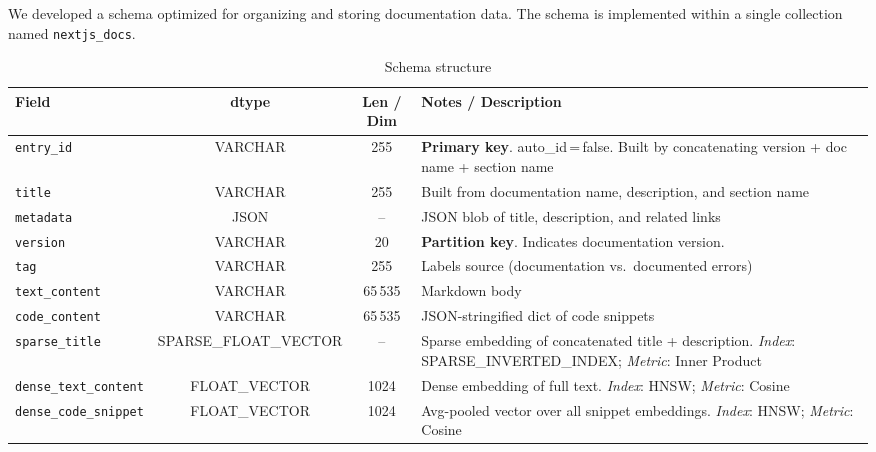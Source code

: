 
We developed a schema optimized for organizing and storing documentation data. The schema is implemented within a single collection named \texttt{nextjs\_docs}.

\begin{table}[H]
	\small
	\centering
	\setlength\tabcolsep{5pt}
	\renewcommand{\arraystretch}{1.2}
	\begin{tabular}{l c c p{6.8cm}}
		\hline
		\textbf{Field} & \textbf{dtype} & \textbf{Len / Dim} & \textbf{Notes  /  Description} \\ \hline
		\texttt{entry\_id}           & VARCHAR                & 255  & \textbf{Primary key}. auto\_id\,=\,false.  Built by concatenating version + doc name + section name \\
		\texttt{title}               & VARCHAR                & 255  & Built from documentation name, description, and section name \\
		\texttt{metadata}            & JSON                   & –    & JSON blob of title, description, and related links \\
		\texttt{version}             & VARCHAR                & 20   & \textbf{Partition key}.  Indicates documentation version.\\
		\texttt{tag}                 & VARCHAR                & 255  & Labels source (documentation vs.\ documented errors) \\
		\hline
		\texttt{text\_content}       & VARCHAR                & 65\,535 & Markdown body \\
		\texttt{code\_content}       & VARCHAR                & 65\,535 & JSON-stringified dict of code snippets \\
		\hline
		\texttt{sparse\_title}       & SPARSE\_FLOAT\_VECTOR  & –    & Sparse embedding of concatenated title + description.  \emph{Index}: SPARSE\_INVERTED\_INDEX; \emph{Metric}: Inner Product \\
		\texttt{dense\_text\_content}& FLOAT\_VECTOR          & 1024 & Dense embedding of full text.  \emph{Index}: HNSW; \emph{Metric}: Cosine \\
		\texttt{dense\_code\_snippet}& FLOAT\_VECTOR          & 1024 & Avg-pooled vector over all snippet embeddings.  \emph{Index}: HNSW; \emph{Metric}: Cosine \\
		\hline
	\end{tabular}
	\caption{Schema structure}
	\label{tab:schema_structure}
\end{table}

